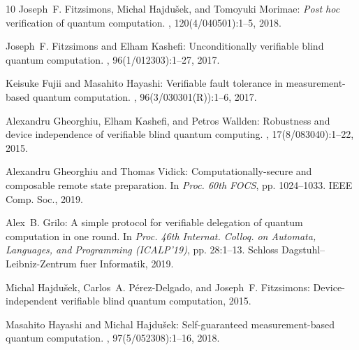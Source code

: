 \documentclass[11pt]{article}
\numberwithin{equation}{section}
\theoremstyle{definition}
\theoremstyle{plain}
\begin{document}
\begin{thebibliography}{10}
{\sc Joseph~F. Fitzsimons, Michal Hajdu\v{s}ek, and Tomoyuki Morimae}:
  \emph{Post hoc} verification of quantum computation.
, 120(4/040501):1--5, 2018.

{\sc Joseph~F. Fitzsimons and Elham Kashefi}: Unconditionally verifiable blind
  quantum computation.
, 96(1/012303):1--27, 2017.

{\sc Keisuke Fujii and Masahito Hayashi}: Verifiable fault tolerance in
  measurement-based quantum computation.
, 96(3/030301(R)):1--6, 2017.

{\sc Alexandru Gheorghiu, Elham Kashefi, and Petros Wallden}: Robustness and
  device independence of verifiable blind quantum computing.
, 17(8/083040):1--22, 2015.

{\sc Alexandru Gheorghiu and Thomas Vidick}: Computationally-secure and
  composable remote state preparation.
\newblock In {\em Proc. 60th FOCS}, pp. 1024--1033. IEEE Comp. Soc., 2019.

{\sc Alex~B. Grilo}: A simple protocol for verifiable delegation of quantum
  computation in one round.
\newblock In {\em Proc. 46th Internat. Colloq. on Automata, Languages, and
  Programming (ICALP'19)}, pp. 28:1--13. Schloss Dagstuhl--Leibniz-Zentrum fuer
  Informatik, 2019.

{\sc Michal Hajdu\v{s}ek, Carlos~A. P\'erez-Delgado, and Joseph~F. Fitzsimons}:
  Device-independent verifiable blind quantum computation, 2015.

{\sc Masahito Hayashi and Michal Hajdu\v{s}ek}: Self-guaranteed
  measurement-based quantum computation.
, 97(5/052308):1--16, 2018.


\end{thebibliography}
\end{document}
